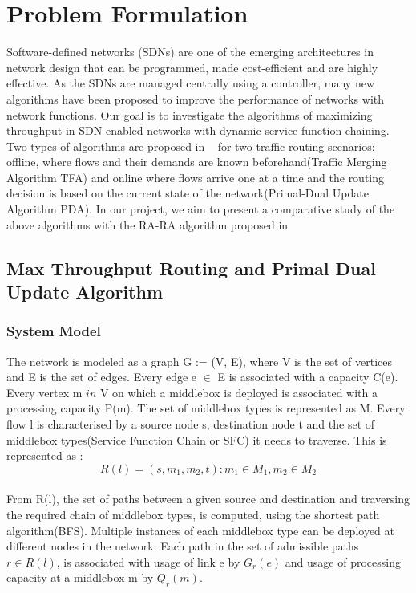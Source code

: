 \section{Problem Formulation}
\label{sec:problemdef}

Software-defined networks (SDNs) are one of the emerging architectures in network design that can be programmed, made cost-efficient and are highly effective. As the SDNs are managed centrally using a controller,  many new algorithms have been proposed to improve the performance of networks with network functions. Our goal is to investigate the algorithms of maximizing throughput in SDN-enabled networks with dynamic service function chaining. Two types of algorithms are proposed in ~\cite{ref:paper1}  for two traffic routing scenarios: offline, where flows and their demands are known beforehand(Traffic Merging Algorithm TFA) and online where flows arrive one at a time and the routing decision is based on the current state of the network(Primal-Dual Update Algorithm PDA). In our project, we aim to present a comparative study of the above algorithms with the RA-RA algorithm proposed in ~\cite{ref:paper2}\\

\subsection{Max Throughput Routing and Primal Dual Update Algorithm \cite{ref:paper1}}
\subsubsection{System Model}
The network is modeled as a graph G := (V, E), where V is the set of vertices and E is the set of edges. Every edge e $\in$ E is associated with a capacity C(e). Every vertex m $in$ V on which a middlebox is deployed is associated with a processing capacity P(m). The set of middlebox types is represented as M. Every flow l is characterised by a source node s, destination node t and the set of middlebox types(Service Function Chain or SFC) it needs to traverse. This is represented as : \newline
$$R(l) = {(s, m_1, m_2, t)} : m_1 \in M_1, m_2 \in M_2$$\\
From R(l), the set of paths between a given source and destination and traversing the required chain of middlebox types, is computed, using the shortest path algorithm(BFS). Multiple instances of each middlebox type can be deployed at different nodes in the network. Each path in the set of admissible paths $r \in  R(l)$, is associated with usage of link e by $G_r(e)$ and usage of processing capacity at a middlebox m by $Q_r(m)$.
\newline

